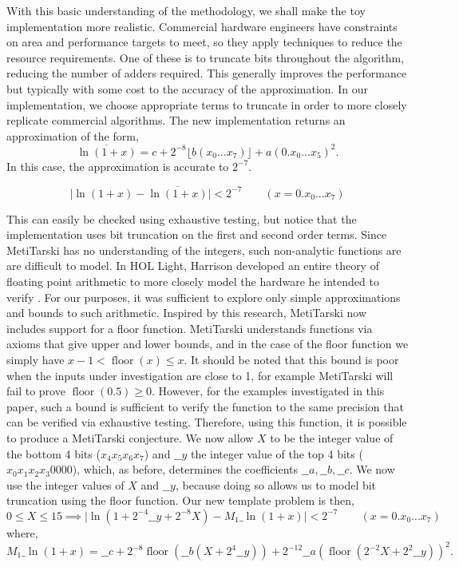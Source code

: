 \documentclass{fac}
\newcommand{\abs}[1]{\lvert#1\rvert}
\newcommand{\floor}{\mathop{\textrm{floor}}\nolimits}
\begin{document}
With this basic understanding of the methodology, we shall make the toy implementation more realistic. Commercial hardware engineers have constraints on area and performance targets to meet, so they apply techniques to reduce the resource requirements. One of these is to truncate bits throughout the algorithm, reducing the number of adders required. This generally improves the performance but typically with some cost to the accuracy of the approximation. In our implementation, we choose appropriate terms to truncate in order to more closely replicate commercial algorithms. The new implementation returns an approximation of the form, 
\begin{equation} \label{update_toy}
\overline{\ln(1+x)}=c + 2^{-8} \lfloor{b(x_0...x_7)} \rfloor +a(0.x_0...x_5)^2. 
\end{equation}
In this case, the approximation is accurate to $2^{-7}$.

\[ \abs{\ln(1+x)-\overline{\ln(1+x)}} <2^{-7} \qquad (x= 0.x_0...x_7) \]

This can easily be checked using exhaustive testing, but notice that the implementation uses bit truncation on the first and second order terms. Since MetiTarski has no understanding of the integers, such non-analytic functions are are difficult to model. In HOL Light, Harrison developed an entire theory of floating point arithmetic to more closely model the hardware he intended to verify \cite{harrison1999machine}. For our purposes, it was sufficient to explore only simple approximations and bounds to such arithmetic. Inspired by this research, MetiTarski now includes support for a floor function. MetiTarski understands functions via axioms that give upper and lower bounds, and in the case of the floor function we simply have $x-1< \floor(x)\le x$. It should be noted that this bound is poor when the inputs under investigation are close to 1, for example MetiTarski will fail to prove $\floor(0.5)\geq 0$.
However, for the examples investigated in this paper, such a bound is sufficient to verify the function to the same precision that can be verified via exhaustive testing. Therefore, using this function, it is possible to produce a MetiTarski conjecture. We now allow $X$ to be the integer value of the bottom 4 bits ($x_4x_5x_6x_7$) and $\_\_y$ the integer value of the top 4 bits ($x_0x_1x_2x_3 0000$), which, as before, determines the coefficients $\_\_a, \_\_b, \_\_c$. We now use the integer values of $X$ and $\_\_y$, because doing so allows us to model bit truncation using the floor function. Our new template problem is then, 
\[
0\le X \le 15 \implies \abs{\ln(1+2^{-4}\_\_y+2^{-8}X) - M_1\_\ln(1+x)} <2^{-7} \qquad (x= 0.x_0...x_7)
\]
where,
\[
M_1\_\ln(1+x)=\_\_c+2^{-8}\floor(\_\_b(X+2^{4}\_\_y))+2^{-12}\_\_a(\floor(2^{-2}X+2^{2}\_\_y))^2.
\]
\end{document}
